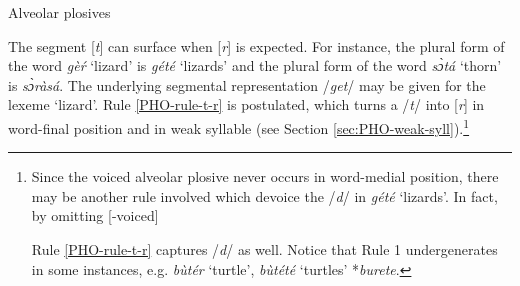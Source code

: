  
\begin{table}[thb] \small
\small
\centering
\caption{Alveolar plosives \label{tab:alveolar-plosives}}

\quad
{}


\end{table}

The segment [{\it t}] can surface when [{\it r}] is expected.  For instance, the 
plural form of the word {\it gèŕ} `lizard' is {\it gété} `lizards' and the 
plural form of the word {\it sɔ̀tá} `thorn'  is {\it sɔ̀ràsá}. The underlying 
segmental representation /{\it get}/ may be given for the lexeme `lizard'.    
Rule \ref{PHO-rule-t-r} is postulated, which turns a /{\it t}/ into  [{\it r}] 
in word-final position and in weak syllable (see Section 
\ref{sec:PHO-weak-syll}).\footnote{Since the voiced  alveolar plosive never 
occurs in word-medial position, there may be another rule involved which devoice 
the /{\it d}/ in   {\it gété} `lizards'. In fact, by omitting [{\sc -voiced}] 
 
Rule \ref{PHO-rule-t-r} captures /{\it d}/  as well. Notice that  Rule 1 
undergenerates in some instances, e.g. {\it bùtér} `turtle', {\it bùtété} 
`turtles'  *{\it burete}.}

